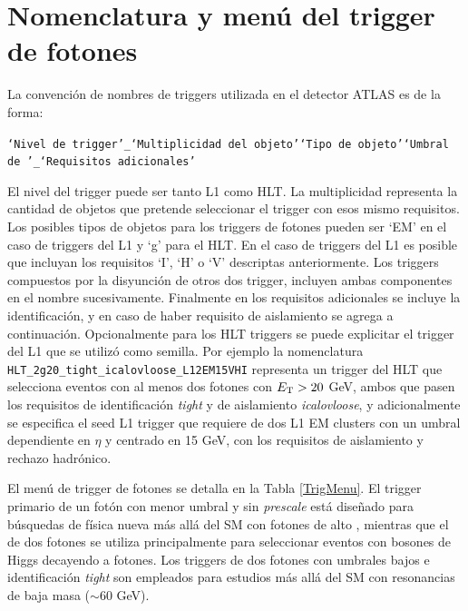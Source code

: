 \section{Nomenclatura y menú del trigger de fotones}

  

La convención de nombres de triggers utilizada en el detector ATLAS es de la forma:

{\footnotesize \texttt{`Nivel de trigger'\_`Multiplicidad del objeto'`Tipo de objeto'`Umbral de \ET'\_`Requisitos adicionales'}}


El nivel del trigger puede ser tanto L1 como HLT. La multiplicidad representa la cantidad de objetos que pretende seleccionar el trigger con esos mismo requisitos. Los posibles tipos de objetos para los triggers de fotones pueden ser `EM' en el caso de triggers del L1 y `g' para el HLT. En el caso de triggers del L1 es posible que incluyan los requisitos `I', `H' o `V' descriptas anteriormente. Los triggers compuestos por la disyunción de otros dos trigger, incluyen ambas componentes en el nombre sucesivamente. Finalmente en los requisitos adicionales se incluye la identificación, y en caso de haber requisito de aislamiento se agrega a continuación. Opcionalmente para los HLT triggers se puede explicitar el trigger del L1 que se utilizó como semilla. Por ejemplo la nomenclatura \texttt{HLT\_2g20\_tight\_icalovloose\_L12EM15VHI} representa un trigger del HLT que selecciona eventos con al menos dos fotones con $E_{\text{T}}>20$ GeV, ambos que pasen los requisitos de identificación \textit{tight} y de aislamiento \textit{icalovloose}, y adicionalmente se especifica el seed L1 trigger que requiere de dos L1 EM clusters con un umbral dependiente en $\eta$ y centrado en 15 GeV, con los requisitos de aislamiento y rechazo hadrónico.

El menú de trigger de fotones se detalla en la Tabla \ref{TrigMenu}. El trigger primario de un fotón con menor umbral y sin \textit{prescale} está diseñado para búsquedas de física nueva más allá del SM con fotones de alto \ET, mientras que el de dos fotones se utiliza principalmente para seleccionar eventos con bosones de Higgs decayendo a fotones. Los triggers de dos fotones con umbrales bajos e identificación \textit{tight} son empleados para estudios más allá del SM con resonancias de baja masa ($\sim60$ GeV).



